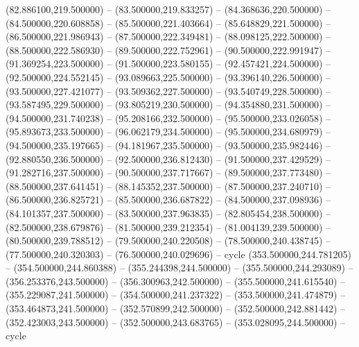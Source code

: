 (82.886100,219.500000) -- (83.500000,219.833257) -- (84.368636,220.500000) -- (84.500000,220.608858) -- (85.500000,221.403664) -- (85.648829,221.500000) -- (86.500000,221.986943) -- (87.500000,222.349481) -- (88.098125,222.500000) -- (88.500000,222.586930) -- (89.500000,222.752961) -- (90.500000,222.991947) -- (91.369254,223.500000) -- (91.500000,223.580155) -- (92.457421,224.500000) -- (92.500000,224.552145) -- (93.089663,225.500000) -- (93.396140,226.500000) -- (93.500000,227.421077) -- (93.509362,227.500000) -- (93.540749,228.500000) -- (93.587495,229.500000) -- (93.805219,230.500000) -- (94.354880,231.500000) -- (94.500000,231.740238) -- (95.208166,232.500000) -- (95.500000,233.026058) -- (95.893673,233.500000) -- (96.062179,234.500000) -- (95.500000,234.680979) -- (94.500000,235.197665) -- (94.181967,235.500000) -- (93.500000,235.982446) -- (92.880550,236.500000) -- (92.500000,236.812430) -- (91.500000,237.429529) -- (91.282716,237.500000) -- (90.500000,237.717667) -- (89.500000,237.773480) -- (88.500000,237.641451) -- (88.145352,237.500000) -- (87.500000,237.240710) -- (86.500000,236.825721) -- (85.500000,236.687822) -- (84.500000,237.098936) -- (84.101357,237.500000) -- (83.500000,237.963835) -- (82.805454,238.500000) -- (82.500000,238.679876) -- (81.500000,239.212354) -- (81.004139,239.500000) -- (80.500000,239.788512) -- (79.500000,240.220508) -- (78.500000,240.438745) -- (77.500000,240.320303) -- (76.500000,240.029696) -- cycle
   (353.500000,244.781205) -- (354.500000,244.860388) -- (355.244398,244.500000) -- (355.500000,244.293089) -- (356.253376,243.500000) -- (356.300963,242.500000) -- (355.500000,241.615540) -- (355.229087,241.500000) -- (354.500000,241.237322) -- (353.500000,241.474879) -- (353.464873,241.500000) -- (352.570899,242.500000) -- (352.500000,242.881442) -- (352.423003,243.500000) -- (352.500000,243.683765) -- (353.028095,244.500000) -- cycle
